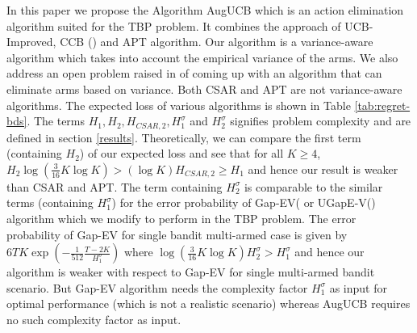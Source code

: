 In this paper we propose the Algorithm AugUCB which is an action elimination algorithm suited for the TBP problem. It combines the approach of UCB-Improved, CCB (\cite{liu2016modification}) and APT algorithm. Our algorithm is a variance-aware algorithm which takes into account the empirical variance of the arms. We also address an open problem raised in \cite{auer2010ucb} of coming up with an algorithm that can eliminate arms based on variance. Both CSAR and APT are not variance-aware algorithms. The expected loss of various algorithms is shown in Table \ref{tab:regret-bds}. The terms $H_1, H_2, H_{CSAR,2}, H_1^{\sigma}$ and $H_2^{\sigma}$ signifies problem complexity and are defined in section \ref{results}. Theoretically, we can compare the first term (containing $H_2$) of our expected loss and see that for all $K\geq 4$, $ H_2 \log(\frac{3}{16} K\log K) > (\log K)H_{CSAR,2}\geq H_1 $ and hence our result is weaker than CSAR and APT. The term containing $H_{2}^{\sigma}$ is comparable to the similar terms (containing $H_1^{\sigma}$) for the error probability of Gap-EV(\cite{gabillon2011multi} or UGapE-V(\cite{gabillon2012best}) algorithm which we modify to perform in the TBP problem. The error probability of Gap-EV for single bandit multi-armed case is given by $6TK\exp(-\frac{1}{512}\frac{T-2K}{H_1^{\sigma}})$ where $\log(\frac{3}{16} K\log K) H_2^{\sigma} > H_1^{\sigma}$ and hence our algorithm is weaker with respect to Gap-EV for single  multi-armed bandit scenario. But Gap-EV algorithm needs the complexity factor $H_1^{\sigma}$ as input for optimal performance (which is not a realistic scenario) whereas AugUCB requires no such complexity factor as input. 

